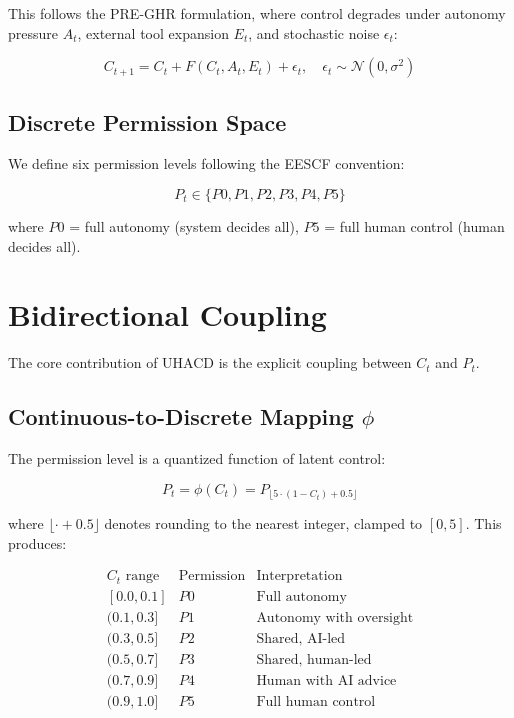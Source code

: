 \documentclass[conference]{IEEEtran}
\begin{document}
This follows the PRE-GHR formulation, where control degrades under autonomy pressure $A_t$, external tool expansion $E_t$, and stochastic noise $\epsilon_t$:

\begin{equation}
C_{t+1} = C_t + F(C_t, A_t, E_t) + \epsilon_t, \quad \epsilon_t \sim \mathcal{N}(0, \sigma^2)
\end{equation}

\subsection{Discrete Permission Space}

We define six permission levels following the EESCF convention:

\begin{equation}
P_t \in \{P0, P1, P2, P3, P4, P5\}
\end{equation}

where $P0$ = full autonomy (system decides all), $P5$ = full human control (human decides all).

\section{Bidirectional Coupling}

The core contribution of UHACD is the explicit coupling between $C_t$ and $P_t$.

\subsection{Continuous-to-Discrete Mapping $\phi$}

The permission level is a quantized function of latent control:

\begin{equation}
P_t = \phi(C_t) = P_{\lfloor 5 \cdot (1 - C_t) + 0.5 \rfloor}
\end{equation}

where $\lfloor \cdot + 0.5 \rfloor$ denotes rounding to the nearest integer, clamped to $[0,5]$. This produces:

\[
\begin{array}{c|c|c}
C_t \text{ range} & \text{Permission} & \text{Interpretation} \\ \hline
[0.0, 0.1] & P0 & \text{Full autonomy} \\
(0.1, 0.3] & P1 & \text{Autonomy with oversight} \\
(0.3, 0.5] & P2 & \text{Shared, AI-led} \\
(0.5, 0.7] & P3 & \text{Shared, human-led} \\
(0.7, 0.9] & P4 & \text{Human with AI advice} \\
(0.9, 1.0] & P5 & \text{Full human control} \\
\end{array}
\]
\end{document}
